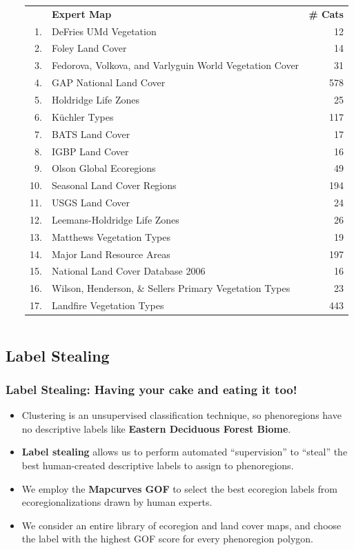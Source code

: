 \begin{frame}
\begin{columns}[c]
\begin{column}{0.45\textwidth}
  \end{column}
  \begin{column}{0.54\textwidth}
   \setlength{\tabcolsep}{2pt}
   \begin{tabular}{r >{\raggedright}p{3.75cm} r}
    \textbf{} & \textbf{Expert Map} & \textbf{\# Cats} \tabularnewline
    1. & DeFries UMd Vegetation & 12 \tabularnewline
    2. & Foley Land Cover & 14 \tabularnewline
    3. & Fedorova, Volkova, and Varlyguin World Vegetation Cover & 31 \tabularnewline
    4. & GAP National Land Cover & 578 \tabularnewline
    5. & Holdridge Life Zones & 25 \tabularnewline
    6. & K\"{u}chler Types & 117 \tabularnewline
    7. & BATS Land Cover & 17 \tabularnewline
    8. & IGBP Land Cover & 16 \tabularnewline
    9. & Olson Global Ecoregions & 49 \tabularnewline
    10. & Seasonal Land Cover Regions & 194 \tabularnewline
    11. & USGS Land Cover & 24 \tabularnewline
    12. & Leemans-Holdridge Life Zones & 26 \tabularnewline
    13. & Matthews Vegetation Types & 19 \tabularnewline
    14. & Major Land Resource Areas & 197 \tabularnewline
    15. & National Land Cover Database 2006 & 16 \tabularnewline
    16. & Wilson, Henderson, \& Sellers Primary Vegetation Types & 23 \tabularnewline
    17. & Landfire Vegetation Types & 443 \tabularnewline
   \end{tabular}
  \end{column}
 \end{columns}
\end{frame}

\subsection{Label Stealing}
\begin{frame}
 \frametitle{Label Stealing: Having your cake and eating it too!}
 \begin{itemize}
  \item Clustering is an unsupervised classification technique, so phenoregions have no descriptive labels like \textbf{Eastern Deciduous Forest Biome}.
  \item \textbf{Label stealing} allows us to perform automated ``supervision'' to ``steal'' the best human-created descriptive labels to assign to phenoregions.
  \item We employ the \textbf{Mapcurves GOF} to select the best ecoregion labels from ecoregionalizations drawn by human experts.
  \item We consider an entire library of ecoregion and land cover maps, and choose the label with the highest GOF score for every phenoregion polygon.
 \end{itemize}
\end{frame}

